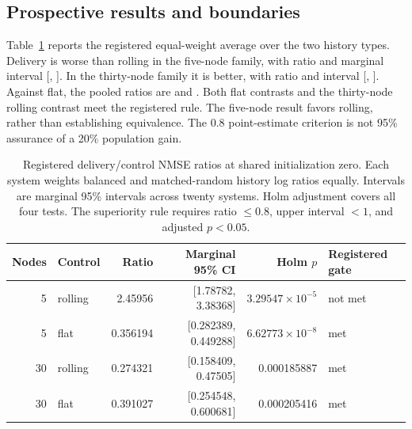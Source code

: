 \subsection{Prospective results and boundaries}
Table~\ref{tab:prospective-primary} reports the registered equal-weight average
over the two history types. Delivery is worse than rolling in the five-node
family, with ratio \BFiveOnlineRatio{} and marginal interval
[\BFiveOnlineCILow{}, \BFiveOnlineCIHigh{}]. In the thirty-node family it is
better, with ratio \BThirtyOnlineRatio{} and interval
[\BThirtyOnlineCILow{}, \BThirtyOnlineCIHigh{}]. Against flat, the pooled ratios
are \BFiveFlatRatio{} and \BThirtyFlatRatio{}. Both flat contrasts and the
thirty-node rolling contrast meet the registered rule. The five-node result
favors rolling, rather than establishing equivalence. The $0.8$ point-estimate
criterion is not 95\% assurance of a 20\% population gain.

\begin{table}[ht]
\centering\small
\begin{tabular}{rlrrrl}
\toprule
Nodes & Control & Ratio & Marginal 95\% CI & Holm $p$ & Registered gate\\
\midrule
5 & rolling & 2.45956 & [1.78782, 3.38368] & $3.29547\times10^{-5}$ & not met\\
5 & flat & 0.356194 & [0.282389, 0.449288] & $6.62773\times10^{-8}$ & met\\
30 & rolling & 0.274321 & [0.158409, 0.47505] & 0.000185887 & met\\
30 & flat & 0.391027 & [0.254548, 0.600681] & 0.000205416 & met\\
\bottomrule
\end{tabular}
\caption{Registered delivery/control NMSE ratios at shared initialization zero. Each system weights balanced and matched-random history log ratios equally. Intervals are marginal 95\% intervals across twenty systems. Holm adjustment covers all four tests. The superiority rule requires ratio $\leq0.8$, upper interval $<1$, and adjusted $p<0.05$.}
\label{tab:prospective-primary}
\end{table}

